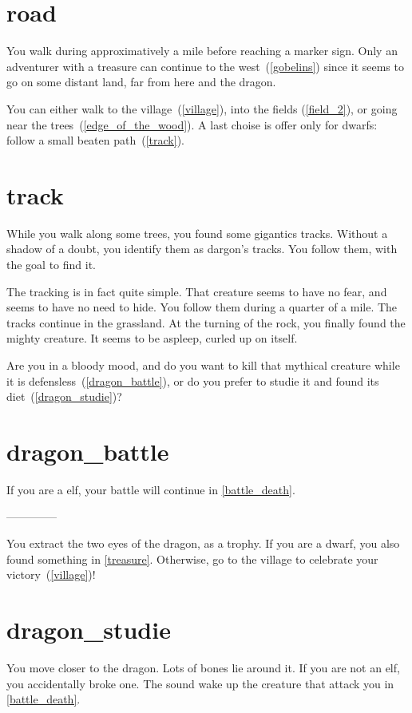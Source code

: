 \section{road}

You walk during approximatively a mile before reaching a marker sign. Only an
adventurer with a treasure can continue to the west~(\ref{gobelins}) since it seems
to go on some distant land, far from here and the dragon.

You can either walk to the village~(\ref{village}), into the fields
(\ref{field_2}), or going near the trees~(\ref{edge_of_the_wood}). A last
choise is offer only for dwarfs: follow a small beaten path~(\ref{track}).

\section{track}

While you walk along some trees, you found some gigantics tracks. Without a
shadow of a doubt, you identify them as dargon's tracks. You follow them, with
the goal to find it.

The tracking is in fact quite simple. That creature seems to have no fear, and
seems to have no need to hide. You follow them during a quarter of a mile. The
tracks continue in the grassland. At the turning of the rock, you finally found
the mighty creature. It seems to be aspleep, curled up on itself.

Are you in a bloody mood, and do you want to kill that mythical creature while it
is defensless~(\ref{dragon_battle}), or do you prefer to studie it and found its
diet~(\ref{dragon_studie})?

\section{dragon_battle}

If you are a elf, your battle will continue in \ref{battle_death}.

--------------


You extract the two eyes of the dragon, as a trophy. If you are a dwarf, you
also found something in \ref{treasure}. Otherwise, go to the village to
celebrate your victory~(\ref{village})!

\section{dragon_studie}

You move closer to the dragon. Lots of bones lie around it. If you are not an
elf, you accidentally broke one. The sound wake up the creature that attack you
in \ref{battle_death}.

